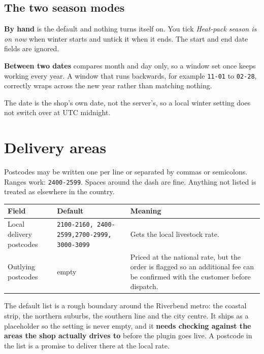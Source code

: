 \documentclass[11pt,a4paper,oneside]{report}
\newcommand{\opt}[1]{\texttt{\small #1}}
\begin{document}
\subsection{The two season modes}

\textbf{By hand} is the default and nothing turns itself on. You tick \emph{Heat-pack
season is on now} when winter starts and untick it when it ends. The start and end
date fields are ignored.

\textbf{Between two dates} compares month and day only, so a window set once keeps
working every year. A window that runs backwards, for example \opt{11-01} to
\opt{02-28}, correctly wraps across the new year rather than matching nothing.

The date is the shop's own date, not the server's, so a local winter setting
does not switch over at UTC midnight.

\section{Delivery areas}

Postcodes may be written one per line or separated by commas or semicolons. Ranges
work: \opt{2400-2599}. Spaces around the dash are fine. Anything not listed is
treated as elsewhere in the country.

\begin{longtable}{@{}L{4.4cm}L{4.4cm}L{5.8cm}@{}}
\toprule
\textbf{Field} & \textbf{Default} & \textbf{Meaning}\\
\midrule
\endhead
Local delivery postcodes & \opt{2100-2160, 2400-2599,}\newline\opt{2700-2999, 3000-3099} & Gets the local livestock rate.\\
\addlinespace
Outlying postcodes & empty & Priced at the national rate, but the order is flagged so an additional fee can be confirmed with the customer before dispatch.\\
\bottomrule
\end{longtable}

\begin{housewarn}
The default list is a rough boundary around the Riverbend metro: the coastal strip,
the northern suburbs, the southern line and the city centre. It ships as a placeholder
so the setting is never empty, and it \textbf{needs checking against the areas the
shop actually drives to} before the plugin goes live. A postcode in the list is a
promise to deliver there at the local rate.
\end{housewarn}
\end{document}
